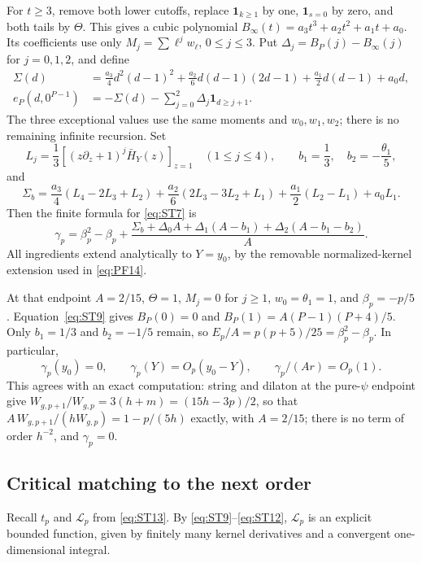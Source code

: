 For $t\ge3$, remove both lower cutoffs, replace
$\mathbf1_{k\ge1}$ by one, $\mathbf1_{s=0}$ by zero, and both tails
by $\Theta$. This gives a cubic polynomial
$B_\infty(t)=a_3t^3+a_2t^2+a_1t+a_0$.
Its coefficients use only $M_j=\sum\ell^jw_\ell$, $0\le j\le3$.
Put $\Delta_j=B_P(j)-B_\infty(j)$ for $j=0,1,2$, and define
\begin{equation}
 \begin{split}
 \Sigma(d)&=\frac{a_3}4d^2(d-1)^2+
       \frac{a_2}6d(d-1)(2d-1)+\frac{a_1}2d(d-1)+a_0d,\\
 e_P(d,0^{P-1})&=-\Sigma(d)-\sum_{j=0}^2\Delta_j\mathbf1_{d\ge j+1}.
 \end{split}
 \label{eq:ST10}
\end{equation}
The three exceptional values use the same moments and $w_0,w_1,w_2$;
there is no remaining infinite recursion. Set
\[
 L_j=\frac13[(z\partial_z+1)^j\bar H_Y(z)]_{z=1}\quad(1\le j\le4),
 \qquad b_1=\frac13,\quad b_2=-\frac{\theta_1}5,
\]
and
\[
 \Sigma_b=\frac{a_3}4(L_4-2L_3+L_2)
   +\frac{a_2}6(2L_3-3L_2+L_1)
   +\frac{a_1}2(L_2-L_1)+a_0L_1.
\]
Then the finite formula for \eqref{eq:ST7} is
\begin{equation}
 \gamma_p=\beta_p^2-\beta_p+
 \frac{\Sigma_b+\Delta_0A+\Delta_1(A-b_1)+\Delta_2(A-b_1-b_2)}A.
 \label{eq:ST11}
\end{equation}
All ingredients extend analytically to $Y=y_0$, by the removable
normalized-kernel extension used in \eqref{eq:PF14}.

At that endpoint $A=2/15$, $\Theta=1$, $M_j=0$ for $j\ge1$,
$w_0=\theta_1=1$, and $\beta_p=-p/5$. Equation~\eqref{eq:ST9}
gives $B_P(0)=0$ and $B_P(1)=A(P-1)(P+4)/5$.
Only $b_1=1/3$ and $b_2=-1/5$ remain, so
$E_p/A=p(p+5)/25=\beta_p^2-\beta_p$. In particular,
\begin{equation}
 \gamma_p(y_0)=0,\qquad \gamma_p(Y)=O_p(y_0-Y),\qquad
 \gamma_p/(Ar)=O_p(1).
 \label{eq:ST12}
\end{equation}
This agrees with an exact computation: string and dilaton at the pure-$\psi$
endpoint give $W_{g,p+1}/W_{g,p}=3(h+m)=(15h-3p)/2$,
so that $A\,W_{g,p+1}/(hW_{g,p})=1-p/(5h)$ exactly, with $A=2/15$;
there is no term of order $h^{-2}$, and $\gamma_p=0$.

\subsection{Critical matching to the next order}\label{app:critical-matching}

Recall $t_p$ and $\mathcal L_p$ from \eqref{eq:ST13}.
By \eqref{eq:ST9}--\eqref{eq:ST12}, $\mathcal L_p$ is an explicit
bounded function, given by finitely many kernel derivatives and a
convergent one-dimensional integral.

